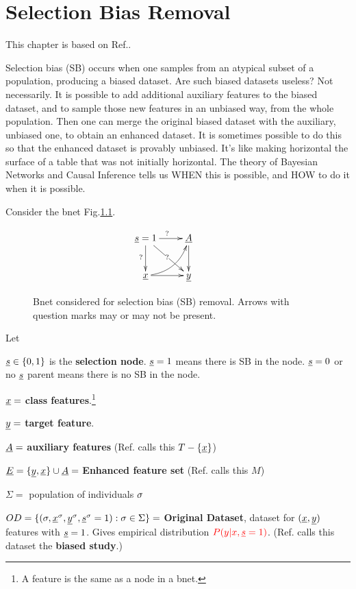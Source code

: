 \chapter{Selection Bias Removal}
This chapter 
is based on Ref.\cite{bare-sb-removal}.

Selection bias (SB)
occurs when one 
samples from an
atypical subset
of a
population,
producing a biased dataset.
Are such biased 
datasets
useless? Not necessarily. 
It is possible to 
add additional auxiliary features
to the biased dataset, and to 
sample those new features
in an unbiased way,
 from the whole population.
Then
one can merge
the original
 biased dataset with the
auxiliary, unbiased one,
to obtain an enhanced dataset.
It is sometimes
possible to do this so that the enhanced
dataset is provably 
unbiased.
It's like making horizontal
the surface of a table
 that was
 not initially
horizontal.
The theory of Bayesian Networks and Causal
Inference tells us 
WHEN this is possible,
and HOW to do it
when it is possible.

Consider the bnet 
Fig.\ref{fig-bs-removal-basic}.

\begin{figure}[h!]
$$
\xymatrix{
\rvs=1\ar[dr]|?\ar[d]_?\ar[r]^?
&\rvA\ar[d]
&
\\
\rvx\ar[r]\ar@/_.9pc/[ru]
&\rvy
}
$$
\caption{Bnet considered for 
selection bias (SB) removal.
Arrows with question marks
may or may not be present.}
\label{fig-bs-removal-basic}
\end{figure}

Let

${\underline{s}}\in\{0,1\}$
is the {\bf selection node}.
${\underline{s}}=1$ means there is 
SB
in the node.
${\underline{s}}=0$ or no ${\underline{s}}$ parent
means there 
is no SB in the node.


${\underline{x}}=$ {\bf class features}.\footnote{
A feature is the same as a node in a bnet.}

${\underline{y}}=$ {\bf target feature}.

${\underline{A}}=$ {\bf auxiliary features}
(Ref.\cite{bare-sb-removal} 
calls this $T-\{{\underline{x}}\}$) 

${\underline{E}}=\{{\underline{y}}, {\underline{x}}\}\cup{\underline{A}}=$ 
{\bf Enhanced feature set}
(Ref.\cite{bare-sb-removal} calls this $M$) 

$\Sigma=$ population of individuals $\sigma$

$OD=\{(\sigma,{\underline{x}}^\sigma,  {\underline{y}}^\sigma,{\underline{s}}^\sigma=1):\sigma\in\Sigma\}=$ 
{\bf Original Dataset}, dataset for $({\underline{x}},{\underline{y}})$ features
with ${\underline{s}}=1$. 
Gives empirical
distribution $\color{red}{P(y|x, {\underline{s}}=1)}$.
(Ref.\cite{bare-sb-removal} 
calls this dataset the {\bf biased study}.)

